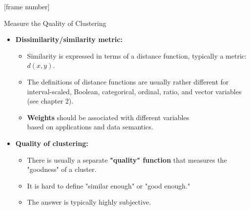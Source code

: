 \documentclass[aspectratio=169,t,xcolor=dvipsnames]{beamer}
\begin{document}
  {
    [frame number]
    \begin{frame}{Measure the Quality of Clustering}
        \begin{itemize}
          \item \textbf{Dissimilarity/similarity metric:}
          \begin{itemize}
            \item Similarity is expressed in terms of a distance function, typically a metric: $d(x,y)$.
            \item The definitions of distance functions are usually rather different for interval-scaled, Boolean, categorical, ordinal, ratio, and vector variables (see chapter 2).
            \item \textbf{\color{airforceblue}Weights} should be associated with different variables \\
                  based on applications and data semantics.
          \end{itemize}
          \item \textbf{Quality of clustering:}
          \begin{itemize}
            \item There is usually a separate \textbf{\color{airforceblue}"quality" function} that measures the "goodness" of a cluster.
            \item It is hard to define "similar enough" or "good enough."
            \item The answer is typically highly subjective.
          \end{itemize}
        \end{itemize}
    \end{frame}
  }
\end{document}
